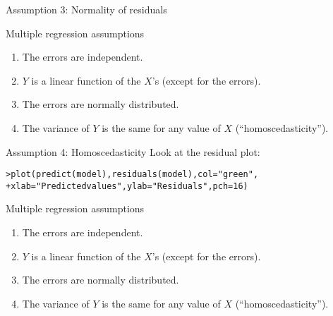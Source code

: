 \documentclass{beamer}\usepackage[]{graphicx}\usepackage[]{color}
\makeatletter
\newcommand{\hlnum}[1]{\textcolor[rgb]{0.824,0.412,0.118}{#1}}%
\newcommand{\hlstr}[1]{\textcolor[rgb]{1,0.894,0.71}{#1}}%
\newcommand{\hlstd}[1]{\textcolor[rgb]{1,0.894,0.769}{#1}}%
\newcommand{\hlkwc}[1]{\textcolor[rgb]{0.78,0.941,0.545}{#1}}%
\newcommand{\hlkwd}[1]{\textcolor[rgb]{1,0.78,0.769}{#1}}%
\newenvironment{kframe}{%
 \def\at@end@of@kframe{}%
 \ifinner\ifhmode%
  \def\at@end@of@kframe{\end{minipage}}%
  \begin{minipage}{\columnwidth}%
 \fi\fi%
 \def\FrameCommand##1{\hskip\@totalleftmargin \hskip-\fboxsep
 \colorbox{shadecolor}{##1}\hskip-\fboxsep
     \hskip-\linewidth \hskip-\@totalleftmargin \hskip\columnwidth}%
 \MakeFramed {\advance\hsize-\width
   \@totalleftmargin\z@ \linewidth\hsize
   \@setminipage}}%
 {\par\unskip\endMakeFramed%
 \at@end@of@kframe}
\newenvironment{knitrout}{}{} %
\makeatother
\begin{document}
\begin{darkframes}
\begin{frame}[fragile]{Assumption 3: Normality of residuals}
\begin{knitrout}
\end{knitrout}
    \end{frame}

    \begin{frame}{Multiple regression assumptions}
      \begin{enumerate}
        \item The errors are independent. \greencheckmark
        \item $Y$ is a linear function of the $X$'s (except for the errors). \greencheckmark
        \item The errors are normally distributed. \greencheckmark
        \item The variance of $Y$ is the same for any value of $X$ (``homoscedasticity'').
      \end{enumerate}
    \end{frame}

    \begin{frame}[fragile]{Assumption 4: Homoscedasticity}
      Look at the residual plot:
      \fontsm
\begin{knitrout}
\begin{kframe}
\begin{alltt}
\hlstd{> }\hlkwd{plot}\hlstd{(}\hlkwd{predict}\hlstd{(model),} \hlkwd{residuals}\hlstd{(model),} \hlkwc{col}\hlstd{=}\hlstr{"green"}\hlstd{,}
\hlstd{+ }  \hlkwc{xlab}\hlstd{=}\hlstr{"Predicted values"}\hlstd{,} \hlkwc{ylab}\hlstd{=}\hlstr{"Residuals"}\hlstd{,} \hlkwc{pch}\hlstd{=}\hlnum{16}\hlstd{)}
\end{alltt}
\end{kframe}


\end{knitrout}
    \end{frame}

    \begin{frame}{Multiple regression assumptions}
      \begin{enumerate}
        \item The errors are independent. \greencheckmark
        \item $Y$ is a linear function of the $X$'s (except for the errors). \greencheckmark
        \item The errors are normally distributed. \greencheckmark
        \item The variance of $Y$ is the same for any value of $X$ (``homoscedasticity''). \shrug[red]
      \end{enumerate}
    \end{frame}


\end{darkframes}
\end{document}
